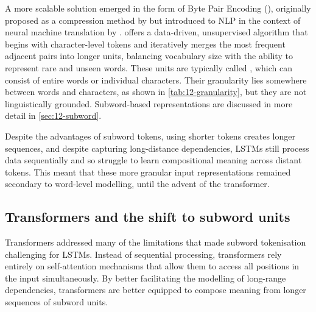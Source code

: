 A more scalable solution emerged in the form of Byte Pair Encoding (\bpe), originally proposed as a compression method by \citet{gage1994new} but introduced to NLP in the context of neural machine translation by \citet{sennrich-etal-2016-bpe}. \bpe offers a data-driven, unsupervised algorithm that begins with character-level tokens and iteratively merges the most frequent adjacent pairs into longer units, balancing vocabulary size with the ability to represent rare and unseen words. These units are typically called , which can consist of entire words or individual characters. Their granularity lies somewhere between words and characters, as shown in \cref{tab:12-granularity}, but they are not linguistically grounded. Subword-based representations are discussed in more detail in \cref{sec:12-subword}.


Despite the advantages of subword tokens, using shorter tokens creates longer sequences, and despite capturing long-distance dependencies, LSTMs still process data sequentially and so struggle to learn compositional meaning across distant tokens. This meant that these more granular input representations remained secondary to word-level modelling, until the advent of the transformer.

\subsection{Transformers and the shift to subword units}

Transformers \citep{vaswani2017attention} addressed many of the limitations that made subword tokenisation challenging for LSTMs. Instead of sequential processing, transformers rely entirely on self-attention mechanisms that allow them to access all positions in the input simultaneously. By better facilitating the modelling of long-range dependencies, transformers are better equipped to compose meaning from longer sequences of subword units. 

